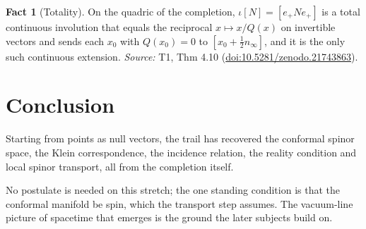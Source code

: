 \documentclass[11pt]{article}
\theoremstyle{definition}
\newtheorem{fact}[theorem]{Fact}
\theoremstyle{plain}
\providecommand{\nInf}{}\renewcommand{\nInf}{n_\infty}
\begin{document}
\begin{fact}[Totality]\label{c:transport.totality}
On the quadric of the completion, $\iota[N] = [e_+ N e_+]$ is a total continuous involution that equals the reciprocal $x \mapsto x/Q(x)$ on invertible vectors and sends each $x_0$ with $Q(x_0) = 0$ to $[x_0 + \frac12 \nInf]$, and it is the only such continuous extension.
\emph{Source:} T1, Thm 4.10 (\href{https://doi.org/10.5281/zenodo.21743863}{doi:10.5281/zenodo.21743863}).
\end{fact}

\section*{Conclusion}
Starting from points as null vectors, the trail has recovered the conformal spinor space, the Klein correspondence, the incidence relation, the reality condition and local spinor transport, all from the completion itself.

No postulate is needed on this stretch; the one standing condition is that the conformal manifold be spin, which the transport step assumes. The vacuum-line picture of spacetime that emerges is the ground the later subjects build on.
\end{document}

